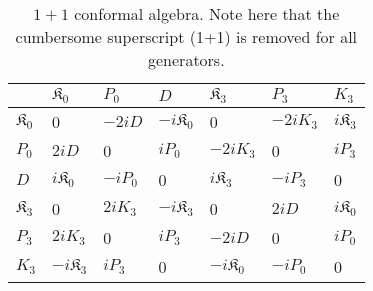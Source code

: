 \documentclass[%
 reprint,
superscriptaddress,
 amsmath,amssymb,
 aps,
]{revtex4-2}
\begin{document}
\begin{table}[h!]
\centering
\setlength{\tabcolsep}{0pt} 
\caption{\label{tabelinterpolationifd}
$1+1$ conformal algebra. Note here that the cumbersome superscript (1+1) is removed for all generators.}
\begin{tabular}{ |>{\centering\arraybackslash}p{1cm}||>{\centering\arraybackslash}p{1cm}|>{\centering\arraybackslash}p{1cm}|>{\centering\arraybackslash}p{1cm}|>{\centering\arraybackslash}p{1cm}|>{\centering\arraybackslash}p{1cm}|>{\centering\arraybackslash}p{1cm}| } 
 \hline
\rule{0pt}{16pt} & $\mathfrak{K}_{{0}}$   & $P_{{0}}$ &  $D$& $\mathfrak{K}_{{3}}$ & $P_{{3}}$& $K_{{3}}$\\
 \hline
  \hline
 \rule{0pt}{16pt}$\mathfrak{K}_{{0}}$ & \cellcolor{blue!20}0&\cellcolor{blue!20}$-2iD$&\cellcolor{blue!20}$-i\mathfrak{K}_{{0}}$&\cellcolor{red!20}0&\cellcolor{red!20}$-2iK_{{3}}$&\cellcolor{red!20}${i\mathfrak{K}_{{3}}}$\\
  \hline 
 \rule{0pt}{16pt}  $P_{{0}}$ &\cellcolor{blue!20}$2iD$&\cellcolor{blue!20}0&\cellcolor{blue!20}$iP_{{0}}$&\cellcolor{red!20}${-2iK_{{3}}}$&\cellcolor{red!20}0&\cellcolor{red!20}${iP_{{3}}}$\\
 \hline
 \rule{0pt}{16pt}$D$ &\cellcolor{blue!20}$i\mathfrak{K}_{{0}}$&\cellcolor{blue!20}$-iP_{{0}}$&\cellcolor{blue!20}0&\cellcolor{red!20}$i\mathfrak{K}_{{3}}$&\cellcolor{red!20}$-iP_{{3}}$&\cellcolor{red!20}0\\
 \hline
 \rule{0pt}{16pt}$\mathfrak{K}_{{3}}$ &\cellcolor{red!20}0&\cellcolor{red!20}${2iK_{{3}}}$&\cellcolor{red!20}$-i\mathfrak{K}_{{3}}$&\cellcolor{cyan!20}0&\cellcolor{cyan!20}$2iD$&\cellcolor{cyan!20}${i\mathfrak{K}_{{0}}}$\\
 \hline 
 \rule{0pt}{16pt}$P_{{3}}$ &\cellcolor{red!20}$2iK_{{3}}$&\cellcolor{red!20}0&\cellcolor{red!20}$iP_{{3}}$&\cellcolor{cyan!20}$-2iD$&\cellcolor{cyan!20}0&\cellcolor{cyan!20}${iP_{{0}}}$\\
 \hline 
 \rule{0pt}{16pt}$K_{{3}}$ &\cellcolor{red!20}${-i\mathfrak{K}_{{3}}}$&\cellcolor{red!20}${iP_{{3}}}$&\cellcolor{red!20}0&\cellcolor{cyan!20}${-i\mathfrak{K}_{{0}}}$&\cellcolor{cyan!20}${-iP_{{0}}}$&\cellcolor{cyan!20}0\\
 \hline 
\end{tabular}
\end{table}
\end{document}
